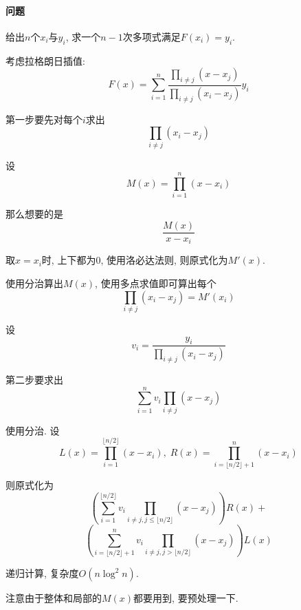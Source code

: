 \paragraph{问题} 给出$n$个$x_i$与$y_i$, 求一个$n-1$次多项式满足$F(x_i)=y_i$.

考虑拉格朗日插值: 
$$F(x)=\sum_{i=1}^n\frac{\prod_{i\neq j}(x-x_j)}{\prod_{i\neq j}(x_i-x_j)}y_i$$

第一步要先对每个$i$求出
$$\prod_{i\neq j}(x_i-x_j)$$

设
$$M(x)=\prod_{i=1}^{n}(x-x_i)$$

那么想要的是
$$\frac{M(x)}{x-x_i}$$

取$x=x_i$时, 上下都为0, 使用洛必达法则, 则原式化为$M'(x)$.

使用分治算出$M(x)$, 使用多点求值即可算出每个
$$\prod_{i\neq j}(x_i-x_j)=M'(x_i)$$

设
$$v_i = \frac{y_i}{\prod_{i\neq j}(x_i-x_j)}$$

第二步要求出$$\sum_{i=1}^{n}v_i\prod_{i\neq j}(x-x_j)$$

使用分治. 设
$$L(x)=\prod_{i=1}^{\lfloor n/2\rfloor}(x-x_i), \; R(x)=\prod_{i=\lfloor n/2\rfloor+1}^n(x-x_i)$$

则原式化为
$$\left( \sum_{i=1}^{\lfloor n/2\rfloor}v_i\prod_{i\neq j,j\leq\lfloor n/2\rfloor}(x-x_j)\right)R(x)+$$
$$\left( \sum_{i=\lfloor n/2\rfloor+1}^{n}v_i\prod_{i\neq j,j>\lfloor n/2\rfloor}(x-x_j)\right)L(x)$$

递归计算, 复杂度$O(n\log^2n)$.

注意由于整体和局部的$M(x)$都要用到, 要预处理一下.

\inputminted{cpp}{../src/math/多项式快速插值.cpp}
